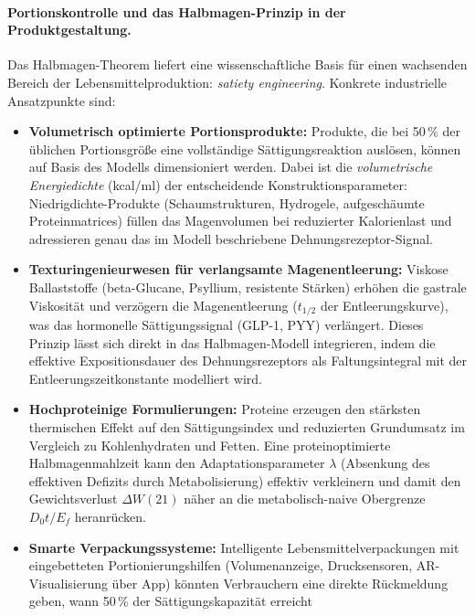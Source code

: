 ﻿\documentclass[12pt,a4paper]{article}
\theoremstyle{plain}
\theoremstyle{definition}
\theoremstyle{remark}
\begin{document}
\paragraph{Portionskontrolle und das Halbmagen-Prinzip in der Produktgestaltung.}
Das Halbmagen-Theorem liefert eine wissenschaftliche Basis für einen
wachsenden Bereich der Lebensmittelproduktion: \emph{satiety engineering}.
Konkrete industrielle Ansatzpunkte sind:

\begin{itemize}
  \item \textbf{Volumetrisch optimierte Portionsprodukte:}
        Produkte, die bei 50\,\% der üblichen Portions\-größe eine
        vollständige Sättigungsreaktion auslösen, können auf Basis des
        Modells dimensioniert werden. Dabei ist die \emph{volumetrische
        Energiedichte} (kcal/ml) der entscheidende Konstruktionsparameter:
        Niedrigdichte-Produkte (Schaumstrukturen, Hydrogele, aufgeschäumte
        Proteinmatrices) füllen das Magenvolumen bei reduzierter
        Kalorienlast und adressieren genau das im Modell beschriebene
        Dehnungsrezeptor-Signal.
  \item \textbf{Texturingenieurwesen für verlangsamte Magenentleerung:}
        Viskose Ballaststoffe (beta-Glucane, Psyllium, resistente Stärken)
        erhöhen die gastrale Viskosität und verzögern die Magenentleerung
        ($t_{1/2}$ der Entleerungskurve), was das hormonelle Sättigungssignal
        (GLP-1, PYY) verlängert. Dieses Prinzip lässt sich direkt in das
        Halbmagen-Modell integrieren, indem die effektive Expositionsdauer
        des Dehnungsrezeptors als Faltungsintegral mit der
        Entleerungszeitkonstante modelliert wird.
  \item \textbf{Hochproteinige Formulierungen:}
        Proteine erzeugen den stärksten thermischen Effekt auf den
        Sättigungsindex und reduzierten Grundumsatz im Vergleich zu
        Kohlenhydraten und Fetten. Eine proteinoptimierte Halbmagenmahlzeit
        kann den Adaptationsparameter $\lambda$ (Absenkung des effektiven
        Defizits durch Metabolisierung) effektiv verkleinern und damit
        den Gewichtsverlust $\Delta W(21)$ näher an die metabolisch-naive
        Obergrenze $D_0 t / E_f$ heranrücken.
  \item \textbf{Smarte Verpackungssysteme:}
        Intelligente Lebensmittelverpackungen mit eingebetteten
        Portionierungshilfen (Volumenanzeige, Drucksensoren,
        AR-Visualisierung über App) könnten Verbrauchern eine direkte
        Rückmeldung geben, wann 50\,\% der Sättigungskapazität erreicht

\end{itemize}
\end{document}
